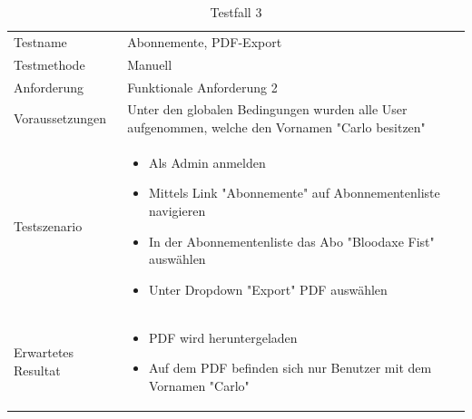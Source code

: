 \begin{table}[h!]
   \begin{tabular}{|L{0.4\textwidth}|L{0.6\textwidth}|}
       \hline
         \\[12pt]
       \hline
        Testname & Abonnemente, PDF-Export \\
       \hline
       Testmethode & Manuell \\
       \hline
        Anforderung & Funktionale Anforderung 2 \\
       \hline
       Voraussetzungen & Unter den globalen Bedingungen wurden alle User aufgenommen, welche den Vornamen
       "Carlo besitzen" \\
       \hline
       Testszenario & 
       \begin{itemize}
         \item Als Admin anmelden
         \item Mittels Link "Abonnemente" auf Abonnementenliste navigieren
         \item In der Abonnementenliste das Abo "Bloodaxe Fist" auswählen
         \item Unter Dropdown "Export" PDF auswählen
       \end{itemize} \\
       \hline
       Erwartetes Resultat & 
       \begin{itemize}
         \item PDF wird heruntergeladen
         \item Auf dem PDF befinden sich nur Benutzer mit dem Vornamen "Carlo"
      \end{itemize}\\
      \hline
     \end{tabular}
     \caption{Testfall 3}
\end{table}

\newpage

